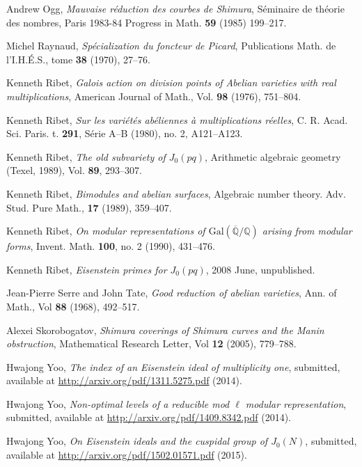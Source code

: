 \documentclass[a4paper, 12pt]{amsart}
\theoremstyle{definition}
\theoremstyle{remark}
\numberwithin{equation}{section} \numberwithin{table}{section}
\begin{document}
\begin{thebibliography}{99}
 Andrew Ogg, \emph{Mauvaise r\'eduction des courbes de Shimura}, S\'eminaire de th\'eorie des nombres, Paris 1983-84 Progress in Math. \textbf{59} (1985) 199--217.

 Michel Raynaud, \emph{Sp\'ecialization du foncteur de Picard}, Publications Math. de l'I.H.\'E.S., tome \textbf{38} (1970), 27--76.

 Kenneth Ribet, \emph{Galois action on division points of Abelian varieties with real multiplications}, American Journal of Math., Vol. \textbf{98} (1976), 751--804.

 Kenneth Ribet, \emph{Sur les vari\'et\'es ab\'eliennes \`a multiplications r\'eelles}, C. R. Acad. Sci. Paris. t. \textbf{291}, S\'erie A--B (1980), no. 2, A121--A123.

 Kenneth Ribet, \emph{The old subvariety of $J_0(pq)$}, Arithmetic algebraic geometry (Texel, 1989), Vol. \textbf{89}, 293--307.

 Kenneth Ribet, \emph{Bimodules and abelian surfaces}, Algebraic number theory. Adv. Stud. Pure Math., \textbf{17} (1989), 359--407.

 Kenneth Ribet, \emph{On modular representations of ${{\mathrm{Gal}}}(\overline {{\mathbb{Q}}}/{{\mathbb{Q}}})$ arising from modular forms}, Invent. Math. \textbf{100}, no. 2 (1990), 431--476.

 Kenneth Ribet, \emph{Eisenstein primes for $J_0(pq)$}, 2008 June, unpublished.

 Jean-Pierre Serre and John Tate, \emph{Good reduction of abelian varieties}, Ann. of Math., Vol \textbf{88} (1968), 492--517.

 Alexei Skorobogatov, \emph{Shimura coverings of Shimura curves and the Manin obstruction}, Mathematical Research Letter, Vol \textbf{12} (2005), 779--788. 

 Hwajong Yoo, \emph{The index of an Eisenstein ideal of multiplicity one}, submitted, available at \url{http://arxiv.org/pdf/1311.5275.pdf} (2014).

 Hwajong Yoo, \emph{Non-optimal levels of a reducible mod $\ell$ modular representation}, submitted, available at \url{http://arxiv.org/pdf/1409.8342.pdf} (2014).

 Hwajong Yoo, \emph{On Eisenstein ideals and the cuspidal group of $J_0(N)$}, submitted, available at \url{http://arxiv.org/pdf/1502.01571.pdf} (2015).
\end{thebibliography}
\end{document}
